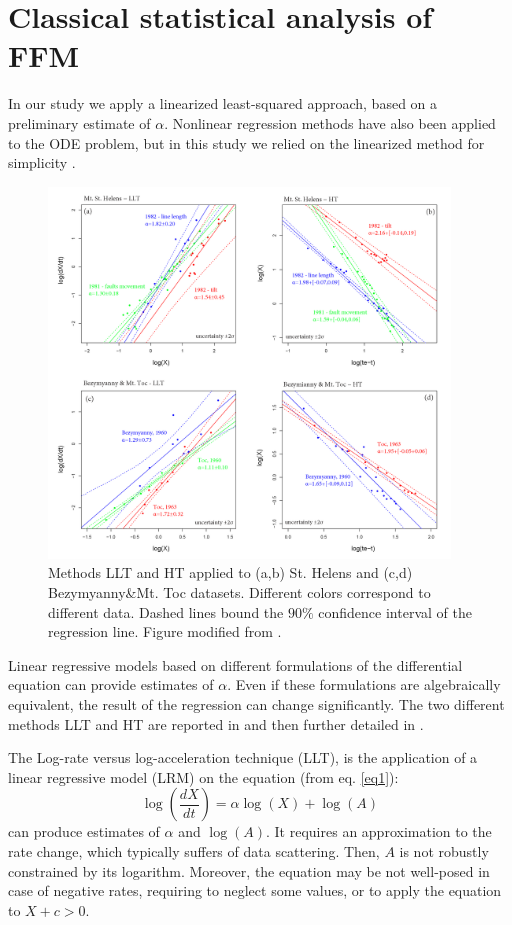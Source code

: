 \documentclass{article}
\begin{document}
\section{Classical statistical analysis of FFM}\label{A-1}
In our study we apply a linearized least-squared approach, based on a preliminary estimate of $\alpha$. Nonlinear regression methods have also been applied to the ODE problem, but in this study we relied on the linearized method for simplicity \citep{Bell2011}. 
\begin{figure}[H]
\centering
\includegraphics[width=0.95\textwidth]{Fig4_plus.png}
\vskip-0.5cm\caption{Methods LLT and HT applied to (a,b) St. Helens and (c,d) Bezymyanny\&Mt. Toc datasets. Different colors correspond to different data. Dashed lines bound the $90\%$ confidence interval of the regression line. Figure modified from \cite{Voight1988}.}
\label{Fig4}
\end{figure}
Linear regressive models based on different formulations of the differential equation can provide estimates of $\alpha$. Even if these formulations are algebraically equivalent, the result of the regression can change significantly. The two different methods LLT and HT are reported in \cite{Voight1988} and then further detailed in \cite{Cornelius1995}.

The Log-rate versus log-acceleration technique (LLT), is the application of a linear regressive model (LRM) on the equation (from eq. \ref{eq1}):
$$\log\left(\frac{dX}{dt}\right)=\alpha\log(X)+\log(A)$$
can produce estimates of $\alpha$ and $\log(A)$. It requires an approximation to the rate change, which typically suffers of data scattering. Then, $A$ is not robustly constrained by its logarithm. Moreover, the equation may be not well-posed in case of negative rates, requiring to neglect some values, or to apply the equation to $X+c > 0$.
\end{document}
